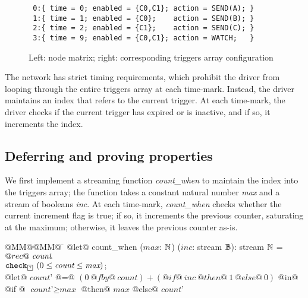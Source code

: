 \begin{figure}
  \begin{minipage}{0.5\textwidth}
\end{minipage}
\begin{minipage}{0.49\textwidth}
\scriptsize
\begin{verbatim}
 0:{ time = 0; enabled = {C0,C1}; action = SEND(A); }
 1:{ time = 1; enabled = {C0};    action = SEND(B); }
 2:{ time = 2; enabled = {C1};    action = SEND(C); }
 3:{ time = 9; enabled = {C0,C1}; action = WATCH;   }
\end{verbatim}
\end{minipage}

\caption{Left: node matrix; right: corresponding triggers array configuration}
\label{f:tt-systemmatrix-ok}
\end{figure}

The network has strict timing requirements, which prohibit the driver from looping through the entire triggers array at each time-mark.
Instead, the driver maintains an index that refers to the current trigger.
At each time-mark, the driver checks if the current trigger has expired or is inactive, and if so, it increments the index.

\subsection{Deferring and proving properties}

We first implement a streaming function \emph{count_when} to maintain the index into the triggers array; the function takes a constant natural number \emph{max} and a stream of booleans \emph{inc}.
At each time-mark, \emph{count_when} checks whether the current increment flag is true; if so, it increments the previous counter, saturating at the maximum; otherwise, it leaves the previous counter as-is.

\begin{tabbing}
  @MM@\= @MM@ \= \kill
  @let@ count_when ($\textit{max}$: $\mathbb{N}$) ($\textit{inc}$: stream $\mathbb{B}$): stream $\mathbb{N}$ = \\
    \> $@rec@~\textit{count}\hspace{-0.1em}.~$ \\
    \> \> $\xcheckP{\PSUnknown}{(0 \le \textit{count} \le \textit{max})}$; \\
    \> \> @let@ $\textit{count'}$ @=@ $(0~@fby@~\textit{count}) + (@if@~\textit{inc}~@then@~1~@else@~0)$ @in@ \\
    \> \> @if @ $\textit{count'} \ge \textit{max}$ @then@ $\textit{max}$  @else@ $\textit{count'}$
\end{tabbing}

